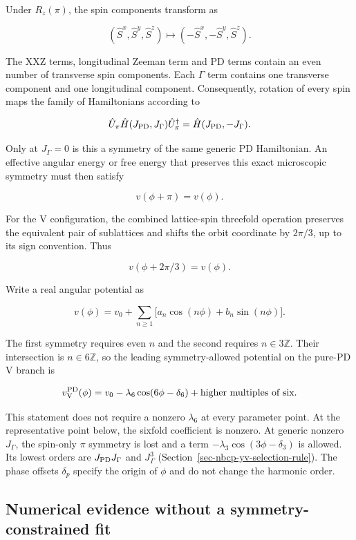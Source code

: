 Under \(R_z(\pi)\), the spin components transform as

\[
(\hat S^x,\hat S^y,\hat S^z)\longmapsto(-\hat S^x,-\hat S^y,\hat S^z).
\]

The XXZ terms, longitudinal Zeeman term and PD terms contain an even
number of transverse spin components. Each \(\Gamma\) term contains one
transverse component and one longitudinal component. Consequently,
rotation of every spin maps the family of Hamiltonians according to

\[
\hat U_\pi\hat H(J_{\rm PD},J_\Gamma)\hat U_\pi^\dagger
=\hat H(J_{\rm PD},-J_\Gamma).
\]

Only at \(J_\Gamma=0\) is this a symmetry of the same generic PD
Hamiltonian. An effective angular energy or free energy that preserves
this exact microscopic symmetry must then satisfy

\[
v(\phi+\pi)=v(\phi).
\]

For the V configuration, the combined lattice-spin threefold operation
preserves the equivalent pair of sublattices and shifts the orbit
coordinate by \(2\pi/3\), up to its sign convention. Thus

\[
v(\phi+2\pi/3)=v(\phi).
\]

Write a real angular potential as

\[
v(\phi)=v_0+\sum_{n\ge1}\bigl[a_n\cos(n\phi)+b_n\sin(n\phi)\bigr].
\]

The first symmetry requires even \(n\) and the second requires
\(n\in3\mathbb Z\). Their intersection is \(n\in6\mathbb Z\), so the
leading symmetry-allowed potential on the pure-PD V branch is

\[
v_{\rm V}^{\rm PD}(\phi)
=v_0-\lambda_6\cos(6\phi-\delta_6)+\text{higher multiples of six}.
\]

This statement does not require a nonzero \(\lambda_6\) at every
parameter point. At the representative point below, the sixfold
coefficient is nonzero. At generic nonzero \(J_\Gamma\), the spin-only
\(\pi\) symmetry is lost and a term \(-\lambda_3\cos(3\phi-\delta_3)\)
is allowed. Its lowest orders are \(J_{\rm PD}J_\Gamma\) and
\(J_\Gamma^3\) (Section~\ref{sec-nbcp-yv-selection-rule}). The phase offsets \(\delta_p\) specify the origin of
\(\phi\) and do not change the harmonic order.

\subsection{Numerical evidence without a symmetry-constrained
fit}\label{numerical-evidence-without-a-symmetry-constrained-fit}

